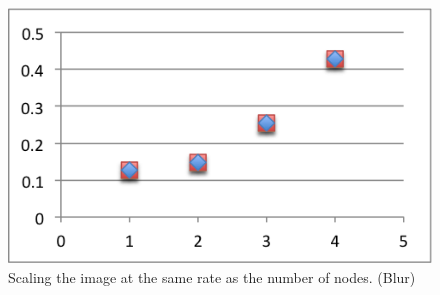 \documentclass[a4paper]{article}
\begin{document}
\begin{figure}
  \centering
  \includegraphics{scaleBlur.png}
  \caption{Scaling the image at the same rate as the number of nodes. (Blur)}
  \label{tab:fig6}
\end{figure}
\end{document}
